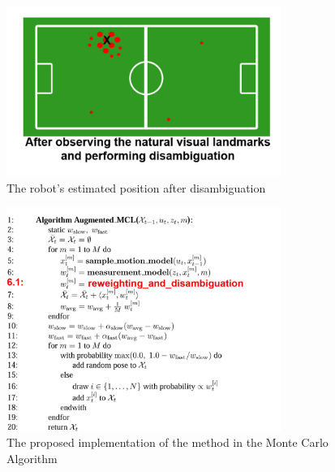 \documentclass{report}
\begin{document}
\begin{figure}[h!] 
  \centering
    \includegraphics[width=0.8\textwidth]{../Drawings/localisation/afterDisambiguate.jpg}
    \caption{The robot's estimated position after disambiguation}
    \label{fig:after}
\end{figure}

\begin{figure}[h!] 
  \centering
    \includegraphics[width=0.8\textwidth]{../Drawings/localisation/MCLAugmented.jpg}
    \caption{The proposed implementation of the method in the Monte Carlo Algorithm \cite{Thrun2002}}
    \label{fig:mclProposed}
\end{figure}


\end{document}
